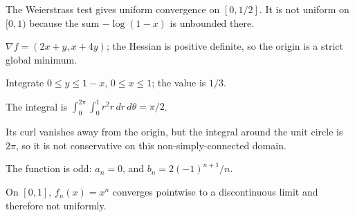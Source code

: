 \begin{selectedhints}
    \item The Weierstrass test gives uniform convergence on $[0,1/2]$. It is not uniform on $[0,1)$ because the sum $-\log(1-x)$ is unbounded there.
    \item $\nabla f=(2x+y,x+4y)$; the Hessian is positive definite, so the origin is a strict global minimum.
    \item Integrate $0\le y\le1-x$, $0\le x\le1$; the value is $1/3$.
    \item The integral is $\int_0^{2\pi}\int_0^1 r^2 r\,dr\,d\theta=\pi/2$.
    \item Its curl vanishes away from the origin, but the integral around the unit circle is $2\pi$, so it is not conservative on this non-simply-connected domain.
    \item The function is odd: $a_n=0$, and $b_n=2(-1)^{n+1}/n$.
    \item On $[0,1]$, $f_n(x)=x^n$ converges pointwise to a discontinuous limit and therefore not uniformly.
\end{selectedhints}
